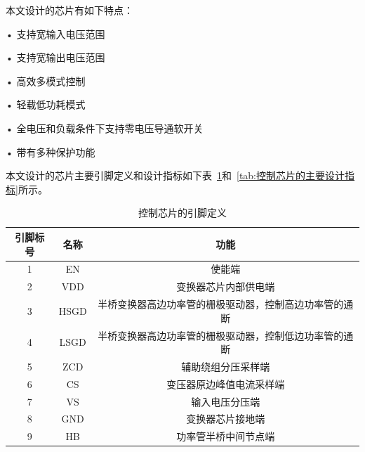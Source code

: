 本文设计的芯片有如下特点：

• 支持宽输入电压范围

• 支持宽输出电压范围

• 高效多模式控制

• 轻载低功耗模式

• 全电压和负载条件下支持零电压导通软开关

• 带有多种保护功能


本文设计的芯片主要引脚定义和设计指标如下表~\ref{tab:控制芯片的引脚定义}和~\ref{tab:控制芯片的主要设计指标}所示。

\begin{table}[htbp]
    \caption{控制芯片的引脚定义}
    \label{tab:控制芯片的引脚定义}
    \centering
    \belowrulesep=0pt  %
    \aboverulesep=0pt  %
        \begin{tabular}{|c|c|c|}
            \toprule
            引脚标号 & 名称 & 功能  \\
            \midrule
            1 & EN   & 使能端                                              \\  \midrule
            2 & VDD  & 变换器芯片内部供电端                                 \\  \midrule
            3 & HSGD & 半桥变换器高边功率管的栅极驱动器，控制高边功率管的通断  \\\midrule  
            4 & LSGD & 半桥变换器高边功率管的栅极驱动器，控制低边功率管的通断  \\\midrule  
            5 & ZCD  & 辅助绕组分压采样端                                    \\  \midrule
            6 & CS   & 变压器原边峰值电流采样端                               \\ \midrule
            7 & VS   & 输入电压分压端                                        \\  \midrule
            8 & GND  & 变换器芯片接地端                                      \\  \midrule
            9 & HB   & 功率管半桥中间节点端                                   \\ 
              
            \bottomrule
        \end{tabular}
\end{table}


